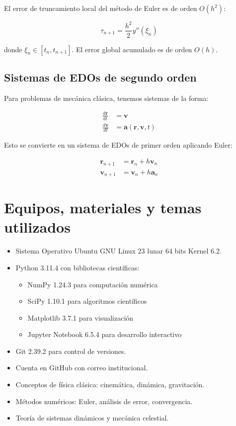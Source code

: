 \documentclass{article}
\begin{document}
	El error de truncamiento local del método de Euler es de orden $O(h^2)$:
	
	\begin{equation}
		\tau_{n+1} = \frac{h^2}{2} y''(\xi_n)
	\end{equation}
	
	donde $\xi_n \in [t_n, t_{n+1}]$. El error global acumulado es de orden $O(h)$.
	
	\subsection{Sistemas de EDOs de segundo orden}
	
	Para problemas de mecánica clásica, tenemos sistemas de la forma:
	
	\begin{align}
		\frac{d\mathbf{r}}{dt} &= \mathbf{v} \\
		\frac{d\mathbf{v}}{dt} &= \mathbf{a}(\mathbf{r}, \mathbf{v}, t)
	\end{align}
	
	Esto se convierte en un sistema de EDOs de primer orden aplicando Euler:
	
	\begin{align}
		\mathbf{r}_{n+1} &= \mathbf{r}_n + h \mathbf{v}_n \\
		\mathbf{v}_{n+1} &= \mathbf{v}_n + h \mathbf{a}_n
	\end{align}
	
	\section{Equipos, materiales y temas utilizados}
	\begin{itemize}
		\item Sistema Operativo Ubuntu GNU Linux 23 lunar 64 bits Kernel 6.2.
		\item Python 3.11.4 con bibliotecas científicas:
		\begin{itemize}
			\item NumPy 1.24.3 para computación numérica
			\item SciPy 1.10.1 para algoritmos científicos
			\item Matplotlib 3.7.1 para visualización
			\item Jupyter Notebook 6.5.4 para desarrollo interactivo
		\end{itemize}
		\item Git 2.39.2 para control de versiones.
		\item Cuenta en GitHub con correo institucional.
		\item Conceptos de física clásica: cinemática, dinámica, gravitación.
		\item Métodos numéricos: Euler, análisis de error, convergencia.
		\item Teoría de sistemas dinámicos y mecánica celestial.
	\end{itemize}
	
\end{document}

